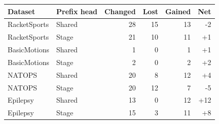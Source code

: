 \begin{tabular}{llrrrr}\toprule
Dataset & Prefix head & Changed & Lost & Gained & Net \\\midrule
RacketSports & Shared & 28 & 15 & 13 & -2 \\
RacketSports & Stage & 21 & 10 & 11 & +1 \\
BasicMotions & Shared & 1 & 0 & 1 & +1 \\
BasicMotions & Stage & 2 & 0 & 2 & +2 \\
NATOPS & Shared & 20 & 8 & 12 & +4 \\
NATOPS & Stage & 20 & 12 & 7 & -5 \\
Epilepsy & Shared & 13 & 0 & 12 & +12 \\
Epilepsy & Stage & 15 & 3 & 11 & +8 \\
\bottomrule\end{tabular}
